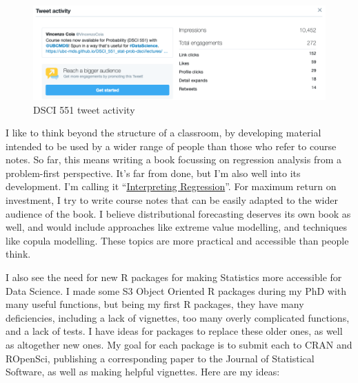 \documentclass[]{article}
\begin{document}
\begin{figure}
\centering
\includegraphics{./img/551_tweet.png}
\caption{DSCI 551 tweet activity}
\end{figure}

I like to think beyond the structure of a classroom, by developing material intended to be used by a wider range of people than those who refer to course notes. So far, this means writing a book focussing on regression analysis from a problem-first perspective. It's far from done, but I'm also well into its development. I'm calling it ``\href{https://interpreting-regression.netlify.com/}{Interpreting Regression}''. For maximum return on investment, I try to write course notes that can be easily adapted to the wider audience of the book. I believe distributional forecasting deserves its own book as well, and would include approaches like extreme value modelling, and techniques like copula modelling. These topics are more practical and accessible than people think.

I also see the need for new R packages for making Statistics more accessible for Data Science. I made some S3 Object Oriented R packages during my PhD with many useful functions, but being my first R packages, they have many deficiencies, including a lack of vignettes, too many overly complicated functions, and a lack of tests. I have ideas for packages to replace these older ones, as well as altogether new ones. My goal for each package is to submit each to CRAN and ROpenSci, publishing a corresponding paper to the Journal of Statistical Software, as well as making helpful vignettes. Here are my ideas:
\end{document}
